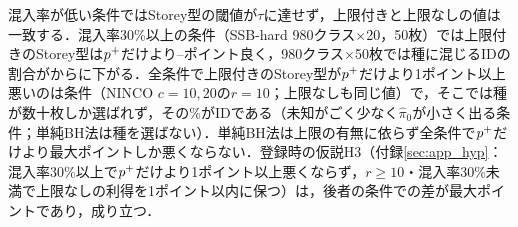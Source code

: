 混入率が低い条件ではStorey型の閾値が$\tau$に達せず，上限付きと上限なしの値は一致する．混入率30\%以上の\NCaprecNHi{}条件（SSB-hard 980クラス$\times$20，50枚）では上限付きのStorey型は$p^{+}$だけより\NCaprecStoreycHiMaxMinusLpAbs{}--\NCaprecStoreycHiMinMinusLpAbs{}ポイント良く，980クラス$\times$50枚では種に混じるIDの割合が\NCaprecSsbHardCNineEightZeroRFiveZeroStoreyIdfrac{}から\NCaprecSsbHardCNineEightZeroRFiveZeroStoreycIdfrac{}に下がる．全\NCaprecNCells{}条件で上限付きのStorey型が$p^{+}$だけより1ポイント以上悪いのは\NCaprecStoreycAllNWorseLpOne{}条件（NINCO $c{=}10,20$の$r{=}10$；上限なしも同じ値）で，そこでは種が数十枚しか選ばれず，その\NCaprecNincoCOneZeroROneZeroStoreycIdfracPct\%がIDである（未知がごく少なく$\hat\pi_0$が小さく出る条件；単純BH法は種を選ばない）．単純BH法は上限の有無に依らず全条件で$p^{+}$だけより最大\NCaprecBhcAllMaxMinusLp{}ポイントしか悪くならない．登録時の仮説H3（付録\ref{sec:app_hyp}：混入率30\%以上で$p^{+}$だけより1ポイント以上悪くならず，$r\ge10$・混入率30\%未満で上限なしの利得を1ポイント以内に保つ）は，後者の\NCaprecLoROneZeroN{}条件での差が最大\NCaprecLoROneZeroMaxStoreycMinusStorey{}ポイントであり，成り立つ．
